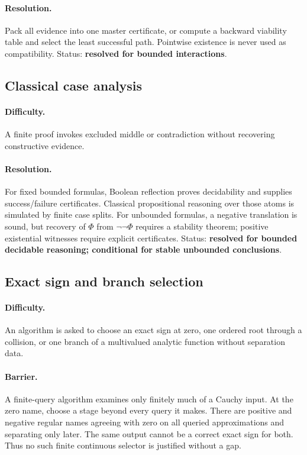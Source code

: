 \paragraph{Resolution.}
Pack all evidence into one master certificate, or compute a backward viability table and select the least successful path.  Pointwise existence is never used as compatibility.  Status: \textbf{resolved for bounded interactions}.

\subsection{Classical case analysis}

\paragraph{Difficulty.}
A finite proof invokes excluded middle or contradiction without recovering constructive evidence.

\paragraph{Resolution.}
For fixed bounded formulas, Boolean reflection proves decidability and supplies success/failure certificates.  Classical propositional reasoning over those atoms is simulated by finite case splits.  For unbounded formulas, a negative translation is sound, but recovery of \(\Phi\) from \(\neg\neg\Phi\) requires a stability theorem; positive existential witnesses require explicit certificates.  Status: \textbf{resolved for bounded decidable reasoning; conditional for stable unbounded conclusions}.

\subsection{Exact sign and branch selection}

\paragraph{Difficulty.}
An algorithm is asked to choose an exact sign at zero, one ordered root through a collision, or one branch of a multivalued analytic function without separation data.

\paragraph{Barrier.}
A finite-query algorithm examines only finitely much of a Cauchy input.  At the zero name, choose a stage beyond every query it makes.  There are positive and negative regular names agreeing with zero on all queried approximations and separating only later.  The same output cannot be a correct exact sign for both.  Thus no such finite continuous selector is justified without a gap.

